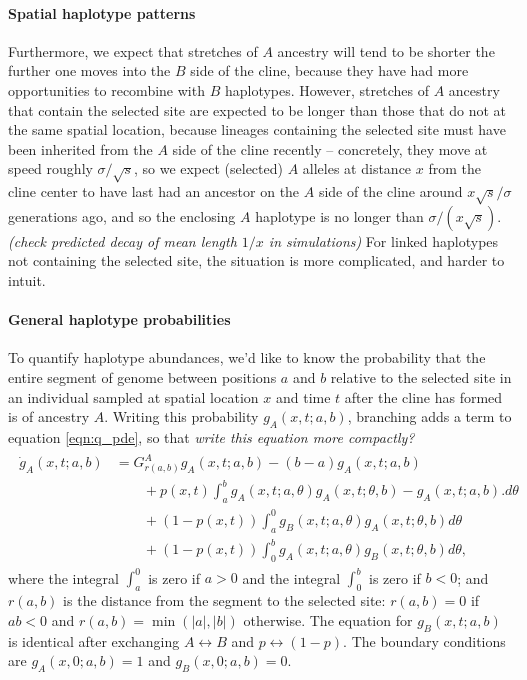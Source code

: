 \documentclass[12pt]{article}
\newcommand{\plr}[1]{{\em \color{blue} #1}}
\begin{document}
\paragraph{Spatial haplotype patterns}
Furthermore, we expect that stretches of $A$ ancestry will tend to be shorter the further one moves into the $B$ side of the cline,
because they have had more opportunities to recombine with $B$ haplotypes.
However, stretches of $A$ ancestry that contain the selected site are expected to be longer
than those that do not at the same spatial location,
because lineages containing the selected site must have been inherited from the $A$ side of the cline recently --
concretely, they move at speed roughly $\sigma/\sqrt{s}$,
so we expect (selected) $A$ alleles at distance $x$ from the cline center
to have last had an ancestor on the $A$ side of the cline around $x \sqrt{s}/\sigma$ generations ago,
and so the enclosing $A$ haplotype is no longer than $\sigma/(x \sqrt{s})$.
\plr{(check predicted decay of mean length $1/x$ in simulations)}
For linked haplotypes not containing the selected site, the situation is more complicated, and harder to intuit.

\paragraph{General haplotype probabilities}
To quantify haplotype abundances,
we'd like to know the probability that the entire segment of genome between positions $a$ and $b$ relative to the selected site
in an individual sampled at spatial location $x$ and time $t$ after the cline has formed
is of ancestry $A$.
Writing this probability $g_A(x,t;a,b)$,
branching adds a term to equation \eqref{eqn:q_pde}, so that 
\plr{write this equation more compactly?}
\begin{align}
    \begin{aligned} \label{eqn:g_pde}
        \dot g_A(x,t;a,b) 
            &= G_{r(a,b)}^A g_A(x,t;a,b) 
            - (b-a) g_A(x,t;a,b) 
            \\ {} & \qquad 
            + p(x,t) \int_a^b {
                g_A(x,t;a,\theta) g_A(x,t;\theta,b) 
                - g_A(x,t;a,b) .
            } d\theta
            \\ {} & \qquad 
            + (1-p(x,t)) \int_a^0 {
                g_B(x,t;a,\theta) g_A(x,t;\theta,b)
            } d\theta
            \\ {} & \qquad 
            + (1-p(x,t)) \int_0^b {
                g_A(x,t;a,\theta) g_B(x,t;\theta,b)
            } d\theta,
    \end{aligned}
\end{align}
where the integral $\int_a^0$ is zero if $a>0$ and the integral $\int_0^b$ is zero if $b<0$;
and $r(a,b)$ is the distance from the segment to the selected site:
$r(a,b)=0$ if $ab<0$ and $r(a,b)=\min(|a|,|b|)$ otherwise.
The equation for $g_B(x,t;a,b)$ is identical after exchanging $A \leftrightarrow B$ and
$p \leftrightarrow (1-p)$.
The boundary conditions are $g_A(x,0;a,b)=1$ and $g_B(x,0;a,b)=0$.
\end{document}
